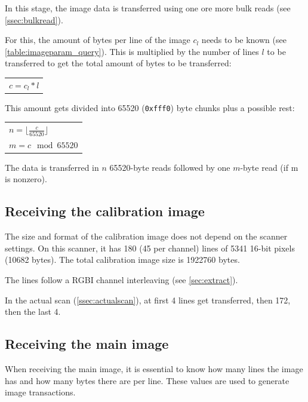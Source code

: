 \documentclass{article}
\begin{document}
In this stage, the image data is transferred using one ore more
bulk reads (see \ref{ssec:bulkread}).

For this, the amount of bytes per line of the image $c_l$ needs to be known
(see \autoref{table:imageparam_query}). This is multiplied by the number of lines $l$ to be transferred
to get the total amount of bytes to be transferred:

\begin{center}
\begin{tabular}{l}
$ c = c_l * l $
\end{tabular}
\end{center}

This amount gets divided into 65520 ({\tt 0xfff0}) byte chunks plus a possible rest:

\begin{center}
\begin{tabular}{l}
$n = \lfloor \frac{c}{65520} \rfloor $ \\
$m = c \mod 65520$ \\
\end{tabular}
\end{center}

The data is transferred in $n$ 65520-byte reads followed by one $m$-byte
read (if m is nonzero).

\subsection{Receiving the calibration image}
\label{ssec:rcv_calibimage}

The size and format of the calibration image does not depend on the scanner settings.
On this scanner, it has 180 (45 per channel) lines of 5341 16-bit pixels (10682 bytes).
The total calibration image size is 1922760 bytes.

The lines follow a RGBI channel interleaving (see \ref{sec:extract}).

In the actual scan (\ref{ssec:actualscan}), at first 4 lines get transferred, then 172, then the last 4.

\subsection{Receiving the main image}
\label{ssec:rcv_mainimage}

When receiving the main image, it is essential to know how many lines the image
has and how many bytes there are per line. These values are used to generate image transactions.
\end{document}
